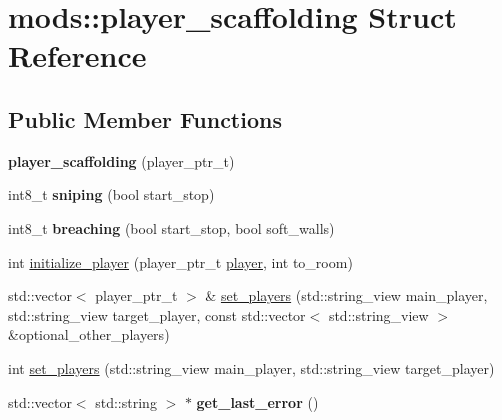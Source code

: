 \hypertarget{structmods_1_1player__scaffolding}{}\section{mods\+:\+:player\+\_\+scaffolding Struct Reference}
\label{structmods_1_1player__scaffolding}
\subsection*{Public Member Functions}
\begin{DoxyCompactItemize}
\item 
\mbox{\label{structmods_1_1player__scaffolding_ab21c5fa76f8fc35502aa1157276e579a}} 
{\bfseries player\+\_\+scaffolding} (player\+\_\+ptr\+\_\+t)
\item 
\mbox{\label{structmods_1_1player__scaffolding_a60ac0e0cbf91dcaf06073b74c8e3a951}} 
int8\+\_\+t {\bfseries sniping} (bool start\+\_\+stop)
\item 
\mbox{\label{structmods_1_1player__scaffolding_a3c3019057bd4878a0b3ae987368b61d1}} 
int8\+\_\+t {\bfseries breaching} (bool start\+\_\+stop, bool soft\+\_\+walls)
\item 
int \hyperlink{structmods_1_1player__scaffolding_a5338073bc0cbf880db342e8a5d2c99bb}{initialize\+\_\+player} (player\+\_\+ptr\+\_\+t \hyperlink{classmods_1_1player}{player}, int to\+\_\+room)
\item 
std\+::vector$<$ player\+\_\+ptr\+\_\+t $>$ \& \hyperlink{structmods_1_1player__scaffolding_a4c8911028cfc28aea79fb8cfe29b7f78}{set\+\_\+players} (std\+::string\+\_\+view main\+\_\+player, std\+::string\+\_\+view target\+\_\+player, const std\+::vector$<$ std\+::string\+\_\+view $>$ \&optional\+\_\+other\+\_\+players)
\item 
int \hyperlink{structmods_1_1player__scaffolding_a61f89cc12c2b7710606d0cdafe2181e0}{set\+\_\+players} (std\+::string\+\_\+view main\+\_\+player, std\+::string\+\_\+view target\+\_\+player)
\item 
\mbox{\label{structmods_1_1player__scaffolding_afb49195839653831e7ec2ef8fb4bf92a}} 
std\+::vector$<$ std\+::string $>$ $\ast$ {\bfseries get\+\_\+last\+\_\+error} ()

\end{DoxyCompactItemize}
